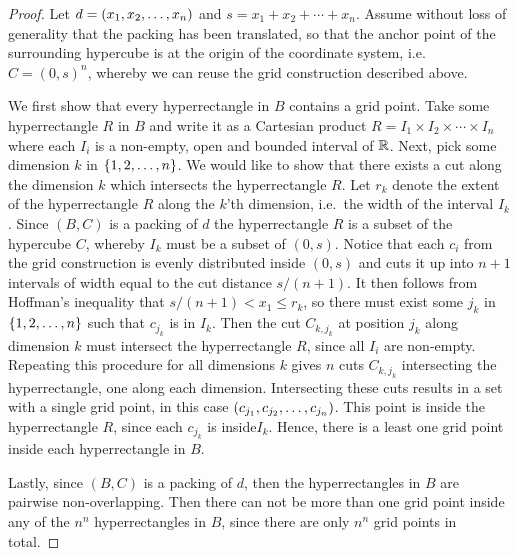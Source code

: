 
\begin{proof}
Let $d = \left( x_1, x_2, \dotsc, x_n \right)$ and $s = x_1 + x_2 + \dotsb + x_n$. Assume without loss of generality that the packing has been translated, so that the anchor point of the surrounding hypercube is at the origin of the coordinate system, i.e.\ $C = (0, s)^n$, whereby we can reuse the grid construction described above.

We first show that every hyperrectangle in $B$ contains a grid point. Take some hyperrectangle $R$ in $B$ and write it as a Cartesian product $R = I_1 \times I_2 \times \dotsb \times I_n$ where each $I_i$ is a non-empty, open and bounded interval of $\mathbb{R}$. Next, pick some dimension $k$ in $\left\{ 1, 2, \dotsc, n \right\}$. We would like to show that there exists a cut along the dimension $k$ which intersects the hyperrectangle $R$. Let $r_k$ denote the extent of the hyperrectangle $R$ along the $k$'th dimension, i.e.\ the width of the interval $I_k$. Since $(B, C)$ is a packing of $d$ the hyperrectangle $R$ is a subset of the hypercube $C$, whereby $I_k$ must be a subset of $(0, s)$. Notice that each $c_i$ from the grid construction is evenly distributed inside $(0, s)$ and cuts it up into $n + 1$ intervals of width equal to the cut distance $s/(n + 1)$. It then follows from Hoffman's inequality that $s/(n + 1) < x_1 \leq r_k$, so there must exist some $j_k$ in $\left\{ 1, 2, \dotsc, n \right\}$ such that $c_{j_k}$ is in $I_k$. Then the cut $C_{k, j_k}$ at position $j_k$ along dimension $k$ must intersect the hyperrectangle $R$, since all $I_i$ are non-empty. Repeating this procedure for all dimensions $k$ gives $n$ cuts $C_{k, j_k}$ intersecting the hyperrectangle, one along each dimension. Intersecting these cuts results in a set with a single grid point, in this case $\left(  c_{j_1}, c_{j_2}, \dotsc, c_{j_n}  \right)$. This point is inside the hyperrectangle $R$, since each $c_{j_k}$ is inside$I_k$. Hence, there is a least one grid point inside each hyperrectangle in $B$.

Lastly, since $(B, C)$ is a packing of $d$, then the hyperrectangles in $B$ are pairwise non-overlapping. Then there can not be more than one grid point inside any of the $n^n$ hyperrectangles in $B$, since there are only $n^n$ grid points in total.
\end{proof}


